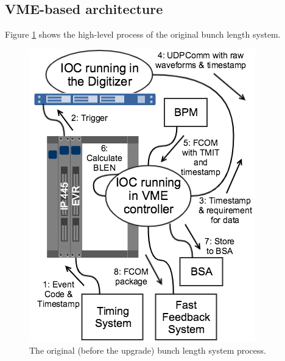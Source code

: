 \documentclass[letter,
        biblatex,   %
        keeplastbox,  %
        ]{jacow}
\begin{document}
\subsection{VME-based architecture}
Figure \ref{fig:blen_vme} shows the high-level process of the original bunch length system.

\begin{figure}[!htb]
  \centering
  \includegraphics*[width=.8\columnwidth]{BLEN_VME_Process}
  \caption{The original (before the upgrade) bunch length system process.}
  \label{fig:blen_vme}
\end{figure}
\end{document}
